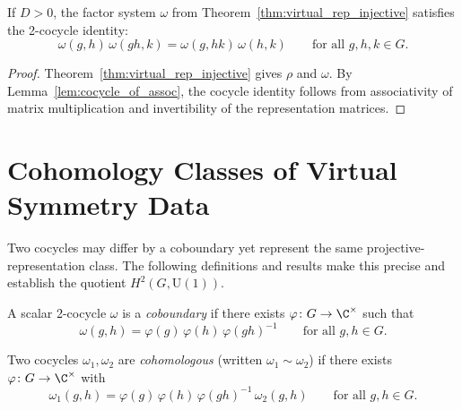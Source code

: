 \begin{corollary}%
    \label{cor:virtual_rep_cocycle}
    \leanok
    If $D > 0$, the factor system $\omega$ from
    Theorem~\ref{thm:virtual_rep_injective} satisfies the
    2-cocycle identity:
    \[
        \omega(g, h)\, \omega(gh, k)
        = \omega(g, hk)\, \omega(h, k)
        \qquad \text{for all } g, h, k \in G.
    \]
\end{corollary}

\begin{proof}
    \leanok
    Theorem~\ref{thm:virtual_rep_injective} gives $\rho$ and $\omega$.
    By Lemma~\ref{lem:cocycle_of_assoc}, the cocycle identity follows
    from associativity of matrix multiplication and invertibility of
    the representation matrices.
\end{proof}

\section{Cohomology Classes of Virtual Symmetry Data}

Two cocycles may differ by a coboundary yet represent the same
projective-representation class.  The following definitions and results
make this precise and establish the quotient $H^2(G,\mathrm{U}(1))$.

\begin{definition}[Coboundary]\label{def:is_coboundary}
    \leanok
    A scalar 2-cocycle $\omega$ is a \emph{coboundary} if there exists
    $\varphi \colon G \to \C^\times$ such that
    \[
        \omega(g,h)
        = \varphi(g)\,\varphi(h)\,\varphi(gh)^{-1}
        \qquad\text{for all } g,h\in G.
    \]
\end{definition}

\begin{definition}\label{def:cohomologous_to}
    \leanok
    Two cocycles $\omega_1,\omega_2$ are \emph{cohomologous}
    (written $\omega_1 \sim \omega_2$) if there exists
    $\varphi\colon G\to\C^\times$ with
    \[
        \omega_1(g,h)
        = \varphi(g)\,\varphi(h)\,\varphi(gh)^{-1}\,\omega_2(g,h)
        \qquad\text{for all } g,h\in G.
    \]
\end{definition}

